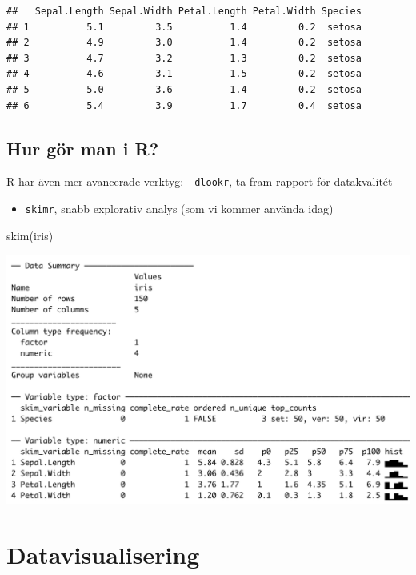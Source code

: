 \documentclass[
]{book}
\newenvironment{Shaded}{\begin{snugshade}}{\end{snugshade}}
\newcommand{\FunctionTok}[1]{\textcolor[rgb]{0.00,0.00,0.00}{#1}}
\newcommand{\NormalTok}[1]{#1}
\providecommand{\tightlist}{%
  \setlength{\itemsep}{0pt}\setlength{\parskip}{0pt}}
\begin{document}
\begin{verbatim}
##   Sepal.Length Sepal.Width Petal.Length Petal.Width Species
## 1          5.1         3.5          1.4         0.2  setosa
## 2          4.9         3.0          1.4         0.2  setosa
## 3          4.7         3.2          1.3         0.2  setosa
## 4          4.6         3.1          1.5         0.2  setosa
## 5          5.0         3.6          1.4         0.2  setosa
## 6          5.4         3.9          1.7         0.4  setosa
\end{verbatim}

\hypertarget{hur-guxf6r-man-i-r-1}{%
\subsection{Hur gör man i R?}\label{hur-guxf6r-man-i-r-1}}

R har även mer avancerade verktyg:
- \texttt{dlookr}, ta fram rapport för datakvalitét

\begin{itemize}
\tightlist
\item
  \texttt{skimr}, snabb explorativ analys (som vi kommer använda idag)
\end{itemize}

\begin{Shaded}
\begin{Highlighting}[]
\FunctionTok{skim}\NormalTok{(iris)}
\end{Highlighting}
\end{Shaded}

\includegraphics{images/Iris_skim.png}

\hypertarget{datavisualisering}{%
\section{Datavisualisering}\label{datavisualisering}}
\end{document}
